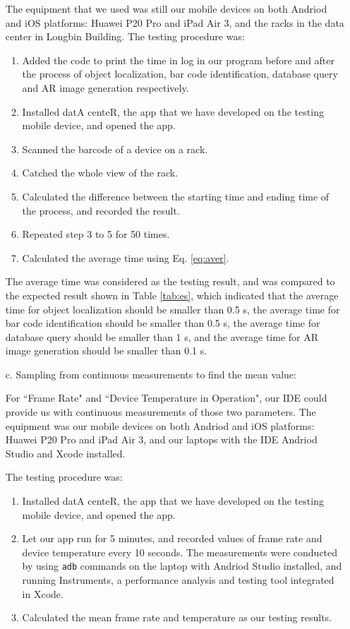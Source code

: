 \documentclass[11pt,a4paper]{article}
\begin{document}
\begin{onehalfspace}
\begin{itemize}
    The equipment that we used was still our mobile devices on both Andriod and iOS platforms: Huawei P20 Pro and iPad Air 3, and the racks in the data center in Longbin Building. The testing procedure was:
    \begin{enumerate}
        \item Added the code to print the time in log in our program before and after the process of object localization, bar code identification, database query and AR image generation respectively.
        \item Installed datA centeR, the app that we have developed on the testing mobile device, and opened the app.
        \item Scanned the barcode of a device on a rack.
        \item Catched the whole view of the rack.
        \item Calculated the difference between the starting time and ending time of the process, and recorded the result.
        \item Repeated step 3 to 5 for 50 times.
        \item Calculated the average time using Eq. \ref{eq:aver}.
    \end{enumerate}
    
    The average time was considered as the testing result, and was compared to the expected result shown in Table \ref{tab:es}, which indicated that the average time for object localization should be smaller than 0.5 s, the average time for bar code identification should be smaller than 0.5 s, the average time for database query should be smaller than 1 s, and the average time for AR image generation should be smaller than 0.1 s.
    
    \item[c.] Sampling from continuous measurements to find the mean value:
    
	For ``Frame Rate" and ``Device Temperature in Operation", our IDE could provide us with continuous measurements of those two parameters. The equipment was our mobile devices on both Andriod and iOS platforms: Huawei P20 Pro and iPad Air 3, and our laptops with the IDE Andriod Studio and Xcode installed. 
	
	The testing procedure was:
	\begin{enumerate}
        \item Installed datA centeR, the app that we have developed on the testing mobile device, and opened the app.
        \item Let our app run for 5 minutes, and recorded values of frame rate and device temperature every 10 seconds. The measurements were conducted by using \texttt{adb} commands on the laptop with Andriod Studio installed, and running Instruments, a performance analysis and testing tool integrated in Xcode.
        \item Calculated the mean frame rate and temperature as our testing results.
    \end{enumerate}
	

\end{itemize}
\end{onehalfspace}
\end{document}
